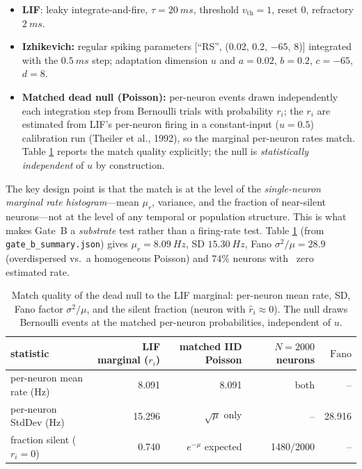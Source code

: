 \documentclass[12pt]{article}
\begin{document}
\begin{itemize}[nosep]
\item \textbf{LIF}: leaky integrate-and-fire, $\tau=\SI{20}{ms}$,
threshold $v_{\mathrm{th}}=1$, reset $0$, refractory $\SI{2}{ms}$.
\item \textbf{Izhikevich:} regular spiking parameters [``RS'', (0.02,
0.2, $-65$, $8$)] integrated with the $\SI{0.5}{ms}$ step; adaptation
dimension $u$ and $a=0.02$, $b=0.2$, $c=-65$, $d=8$.
\item \textbf{Matched dead null (Poisson):} per-neuron events drawn
independently each integration step from Bernoulli trials with
probability $r_i$; the $r_i$ are estimated from LIF's per-neuron
firing in a constant-input ($u=0.5$) calibration run
(Theiler et al., 1992), so the marginal per-neuron rates match. Table
\ref{tab:hist} reports the match quality explicitly; the null is
\emph{statistically independent} of $u$ by construction.
\end{itemize}

The key design point is that the match is at the level of the
\emph{single-neuron marginal rate histogram}---mean $\mu_r$, variance,
and the fraction of near-silent neurons---not at the level of any
temporal or population structure. This is what makes Gate~B a
\emph{substrate} test rather than a firing-rate test. Table
\ref{tab:hist} (from \texttt{gate\_b\_summary.json}) gives
$\mu_r=\SI{8.09}{Hz}$, SD $\SI{15.30}{Hz}$, Fano
$\sigma^2/\mu=28.9$ (overdispersed vs.\ a homogeneous Poisson) and
$74\%$ neurons with ~zero estimated rate.

\begin{table}[H]
\centering
\caption{Match quality of the dead null to the LIF marginal:
per-neuron mean rate, SD, Fano factor $\sigma^2/\mu$, and the silent
fraction (neuron with $\hat r_i\approx0$). The null draws Bernoulli
events at the matched per-neuron probabilities, independent of $u$.}
\label{tab:hist}
\begin{tabular}{lrrrr}
\toprule
statistic & LIF marginal ($r_i$) & matched IID Poisson & $N=2000$ neurons & $\mathrm{Fano}$ \\
\midrule
per-neuron mean rate (Hz) & 8.091 & 8.091 & both & -- \\
per-neuron StdDev (Hz) & 15.296 & $\sqrt{\mu}$ only & -- & 28.916 \\
fraction silent ($r_i=0$) & 0.740 & $e^{-\mu}$ expected & 1480/2000 & -- \\
\bottomrule
\end{tabular}
\end{table}
\end{document}
